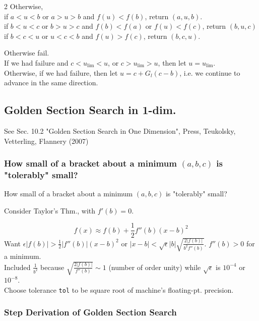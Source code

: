 \documentclass[10pt]{amsart}
\begin{document}
\begin{multicols*}{2}
Otherwise, \\
if $a< u <b$ or $a> u >b$ and $f(u) < f(b)$, return $(a, u, b)$. \\
if $b< u < c$ or $b> u >c$ and $f(b) < f(a)$ or $f(u) < f(c)$, return $(b, u ,c)$ \\
if $b< c < u$ or $u<c< b$ and $f(u) > f(c)$, return $(b, c, u)$.

Otherwise fail. \\

If we had failure and $c< u_{\lim} < u$, or $c> u_{\lim} > u$, then let $u= u_{\lim}$.  \\

Otherwise, if we had failure, then let $u=c + G_l(c-b)$, i.e. we continue to advance in the same direction.

\subsection{Golden Section Search in 1-dim.}

See Sec. 10.2 "Golden Section Search in One Dimension", Press, Teukolsky, Vetterling, Flannery (2007) \cite{PTVF2007}

\subsubsection{How small of a bracket about a minimum $(a,b,c)$ is "tolerably" small?}

How small of a bracket about a minimum $(a,b,c)$ is "tolerably" small?

Consider Taylor's Thm., with $f'(b) = 0$.

\[
f(x) \approx f(b) + \frac{1}{2} f''(b) (x-b)^2
\]
Want $\epsilon | f(b) | > \frac{1}{2} |f''(b) | (x-b)^2$ or $|x-b| < \sqrt{\epsilon} |b| \sqrt{ \frac{2 |f(b)| }{b^2 f''(b)} }$. $f''(b) > 0$ for a minimum. \\

Included $\frac{1}{b^2}$ because $\sqrt{ \frac{2 | f(b)| }{ f''(b)} } \sim 1$ (number of order unity) while $\sqrt{\epsilon}$ is $10^{-4}$ or $10^{-8}$. \\

Choose tolerance \texttt{tol} to be square root of machine's floating-pt. precision.

\subsubsection{Step Derivation of Golden Section Search}


\end{multicols*}
\end{document}
